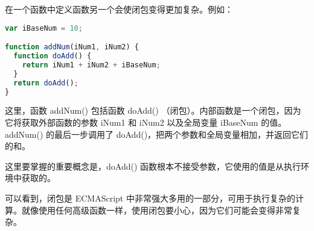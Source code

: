 在一个函数中定义函数另一个会使闭包变得更加复杂。例如：



\begin{lstlisting}[language=JavaScript]
var iBaseNum = 10;

function addNum(iNum1, iNum2) {
  function doAdd() {
    return iNum1 + iNum2 + iBaseNum;
  }
  return doAdd();
}
\end{lstlisting}


这里，函数 addNum() 包括函数 doAdd() （闭包）。内部函数是一个闭包，因为它将获取外部函数的参数 iNum1 和 iNum2 以及全局变量 iBaseNum 的值。 addNum() 的最后一步调用了 doAdd()，把两个参数和全局变量相加，并返回它们的和。

这里要掌握的重要概念是，doAdd() 函数根本不接受参数，它使用的值是从执行环境中获取的。

可以看到，闭包是 ECMAScript 中非常强大多用的一部分，可用于执行复杂的计算。就像使用任何高级函数一样，使用闭包要小心，因为它们可能会变得非常复杂。























